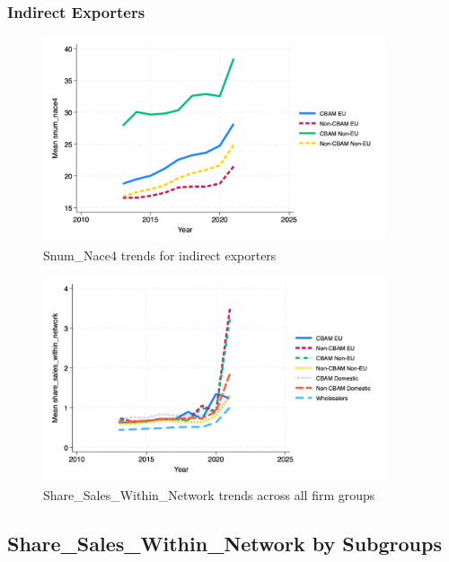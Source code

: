 \documentclass{article}
\begin{document}
\subsubsection{Indirect Exporters}
\begin{figure}[h!]
\centering
\includegraphics[width=0.9\textwidth]{snum_nace4_indir.png}
\caption{Snum_Nace4 trends for indirect exporters}
\label{fig:snum_nace4_indir}
\end{figure}

\begin{figure}[h!]
\centering
\includegraphics[width=0.9\textwidth]{share_sales_within_network_main_groups.png}
\caption{Share_Sales_Within_Network trends across all firm groups}
\label{fig:share_sales_within_network_main}
\end{figure}

\subsection{Share_Sales_Within_Network by Subgroups}
\end{document}
